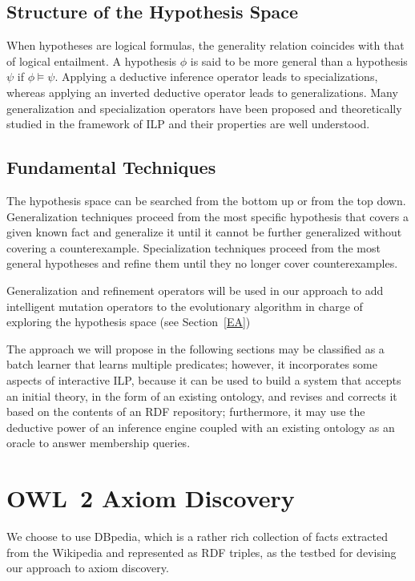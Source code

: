\documentclass[a4paper]{article}
\newcounter{ex}
\begin{document}
\subsection{Structure of the Hypothesis Space}

When hypotheses are logical formulas, the generality relation coincides with that
of logical entailment. A hypothesis $\phi$ is said to be more general than a hypothesis $\psi$
if $\phi \models \psi$. Applying a deductive inference operator leads to specializations,
whereas applying an inverted deductive operator leads to generalizations.
Many generalization and specialization operators have been proposed and theoretically studied
in the framework of ILP and their properties are well understood.

\subsection{Fundamental Techniques}

The hypothesis space can be searched from the bottom up or from the top down.
Generalization techniques proceed from the most specific hypothesis that covers a
given known fact and generalize it until it cannot be further generalized without
covering a counterexample.
Specialization techniques proceed from the most general hypotheses and refine them
until they no longer cover counterexamples.

Generalization and refinement operators will be used in our approach to add intelligent
mutation operators to the evolutionary algorithm in charge of exploring the hypothesis
space (see Section~\ref{EA})

The approach we will propose in the following sections may be classified as a
batch learner that learns multiple predicates; however, it incorporates some aspects
of interactive ILP, because it can be used to build a system that accepts an initial theory,
in the form of an existing ontology, and revises and corrects it based on the contents
of an RDF repository; furthermore, it may use the deductive power of an inference engine
coupled with an existing ontology as an oracle to answer membership queries.

\section{OWL~2 Axiom Discovery}
\label{axiom-discovery}

We choose to use DBpedia, which is a rather rich collection of
facts extracted from the Wikipedia and represented as RDF triples,
as the testbed for devising our approach to axiom discovery.
\end{document}
